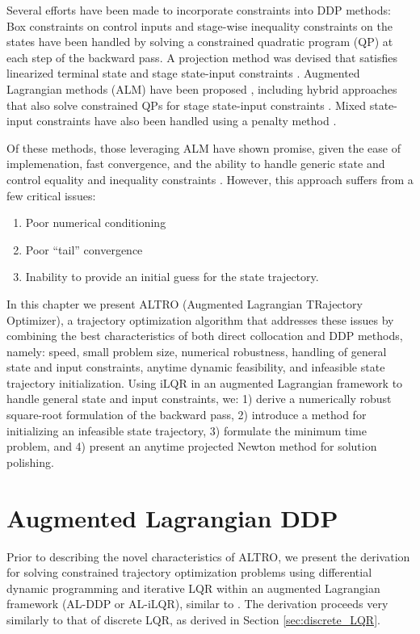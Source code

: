 \documentclass[../root.tex]{subfiles}
\begin{document}
Several efforts have been made to incorporate constraints into DDP methods:
Box constraints on control inputs \cite{tassa_Controllimited_2014} and stage-wise inequality
constraints on the states \cite{xie_Differential_2017,lin_Differential_1991} 
have been handled by solving a
constrained quadratic program (QP) at each step of the backward pass. A
projection method was devised that satisfies linearized terminal state and
stage state-input constraints \cite{giftthaler_projection_2017}. Augmented Lagrangian
methods (ALM) have been proposed \cite{plancher_Constrained_2017}, including hybrid
approaches that also solve constrained QPs for stage state-input constraints
\cite{lantoine_Hybrid_,lin_Differential_1991}. Mixed state-input constraints have also been
handled using a penalty method \cite{farshidian_efficient_2017}.

Of these methods, those leveraging ALM have shown promise, given the ease of
implemenation, fast convergence, and the ability to handle generic state and
control equality and inequality constraints \cite{plancher_Constrained_2017}. 
However, this approach suffers from a few critical issues:
\begin{enumerate}
    \item Poor numerical conditioning
    \item Poor ``tail'' convergence
    \item Inability to provide an initial guess for the state trajectory.
\end{enumerate}
In this chapter we present ALTRO (Augmented Lagrangian TRajectory Optimizer), a
trajectory optimization algorithm that addresses these issues by
combining the best characteristics of
both direct collocation and DDP methods, namely: speed, small problem size,
numerical robustness, handling of general state and input constraints,
anytime dynamic feasibility, and infeasible state trajectory initialization.
Using iLQR in an augmented Lagrangian framework to handle general state and
input constraints, we: 1) derive a numerically robust square-root formulation
of the backward pass, 2) introduce a method for initializing an infeasible
state trajectory, 3) formulate the minimum time problem, and 4) present an
anytime projected Newton method for solution polishing.

\section{Augmented Lagrangian DDP}

Prior to describing the novel characteristics of ALTRO, we present the
derivation for solving constrained trajectory optimization problems using
differential dynamic programming and iterative LQR within an augmented
Lagrangian framework (AL-DDP or AL-iLQR), similar to
\cite{plancher_Constrained_2017}. The derivation proceeds very similarly to
that of discrete LQR, as derived in Section \ref{sec:discrete_LQR}.
\end{document}
